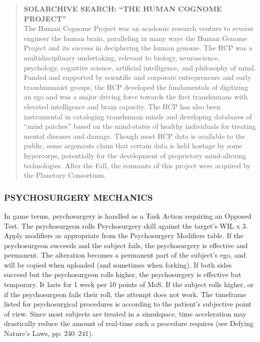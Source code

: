 \begin{quotation}
\textbf{SOLARCHIVE SEARCH: “THE HUMAN COGNOME PROJECT” }
\\
The Human Cognome Project was an
academic research venture to reverse
engineer the human brain, paralleling
in many ways the Human Genome
Project and its success in deciphering
the human genome. The HCP was a
multidisciplinary undertaking, relevant
to biology, neuroscience, psychology,
cognitive science, artificial intelligence,
and philosophy of mind.
Funded and supported by scientific
and corporate entrepreneurs and early
transhumanist groups, the HCP developed
the fundamentals of digitizing an ego
and was a major driving force towards
the first transhumans with elevated
intelligence and brain capacity. The HCP
has also been instrumental in cataloging
transhuman minds and developing
databases of “mind patches” based on
the mind-states of healthy individuals for
treating mental diseases and damage.
Though most HCP data is available to the
public, some argonauts claim that certain
data is held hostage by some hypercorps,
potentially for the development of proprietary
mind-altering technologies.
After the Fall, the remnants of this
project were acquired by the Planetary
Consortium.
\end{quotation}

\subsubsection{PSYCHOSURGERY MECHANICS}
In game terms, psychosurgery is handled as a Task
Action requiring an Opposed Test. The psychosurgeon
rolls Psychosurgery skill against the target’s WIL x 3.
Apply modifiers as appropriate from the Psychosurgery
Modifiers table.
If the psychosurgeon succeeds and the subject fails,
the psychosurgery is effective and permanent. The
alteration becomes a permanent part of the subject’s
ego, and will be copied when uploaded (and sometimes
when forking).
If both sides succeed but the psychosurgeon rolls
higher, the psychosurgery is effective but temporary. It
lasts for 1 week per 10 points of MoS.
If the subject rolls higher, or if the psychosurgeon
fails their roll, the attempt does not work.
The timeframe listed for psychosurgical procedures
is according to the patient’s subjective point of view.
Since most subjects are treated in a simulspace, time
acceleration may drastically reduce the amount of
real-time such a procedure requires (see Defying Nature’s
Laws, pp. 240–241).


